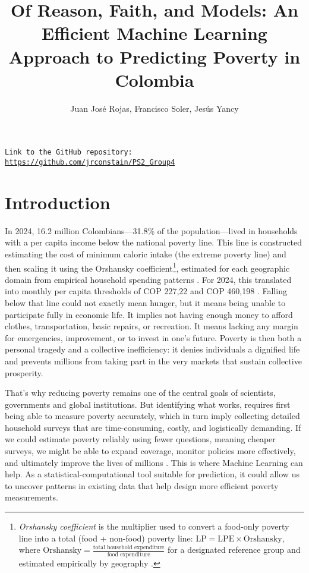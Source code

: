 \documentclass[12pt,a4paper,onecolumn]{article}
\title{\textbf{Of Reason, Faith, and Models: An Efficient Machine Learning Approach to Predicting Poverty in Colombia}}
\author{Juan Jos\'e Rojas, Francisco Soler, Jes\'us Yancy }
\date{}
\begin{document}
\maketitle
\thispagestyle{empty}
\begin{center}
\texttt{Link to the GitHub repository: \url{https://github.com/jrconstain/PS2_Group4}}
\end{center}


\section{Introduction}

In 2024, 16.2 million Colombians—31.8\% of the population—lived in households with a per capita income below the national poverty line. This line is constructed estimating the cost of minimum caloric intake (the extreme poverty line) and then scaling it using the Orshansky coefficient\footnote{ \emph{Orshansky coefficient} is the multiplier used to convert a food-only
poverty line into a total (food + non-food) poverty line:
\( \mathrm{LP} = \mathrm{LPE} \times \mathrm{Orshansky} \), where
\( \mathrm{Orshansky} = \frac{\text{total household expenditure}}{\text{food expenditure}} \)
for a designated reference group and estimated empirically by geography \citep{DANE2025a}.}, estimated for each geographic domain from empirical household spending patterns \citep{DANE2025a}. For 2024, this translated into monthly per capita thresholds of COP 227,22 and COP 460,198 \citep{DANE2025b}. Falling below that line could not exactly mean hunger, but it means being unable to participate fully in economic life. It implies not having enough money to afford clothes, transportation, basic repairs, or recreation. It means lacking any margin for emergencies, improvement, or to invest in one’s future. Poverty is then both a personal tragedy and a collective inefficiency: it denies individuals a dignified life and prevents millions from taking part in the very markets that sustain collective prosperity.

That’s why reducing poverty remains one of the central goals of scientists, governments and global institutions. But identifying what works, requires first being able to measure poverty accurately, which in turn imply collecting detailed household surveys that are time-consuming, costly, and logistically demanding. If we could estimate poverty reliably using fewer questions, meaning cheaper surveys, we might be able to expand coverage, monitor policies more effectively, and ultimately improve the lives of millions \citep{DrivenData2018Poverty}. This is where Machine Learning can help. As a statistical-computational tool suitable for prediction, it could allow us to uncover patterns in existing data that help design more efficient poverty measurements. 
\end{document}
